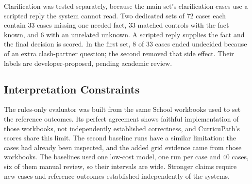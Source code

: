 Clarification was tested separately, because the main set's clarification
cases use a scripted reply the system cannot read. Two dedicated sets of 72
cases each contain 33 cases missing one needed fact, 33 matched controls with
the fact known, and 6 with an unrelated unknown. A scripted reply supplies the
fact and the final decision is scored. In the first set, 8 of 33 cases ended
undecided because of an extra clash-partner question; the second removed that
side effect. Their labels are developer-proposed, pending academic review.

\subsection{Interpretation Constraints}
The rules-only evaluator was built from the same School workbooks used to set
the reference outcomes. Its perfect agreement shows faithful implementation of
those workbooks, not independently established correctness, and CurricuPath's
scores share this limit. The second baseline runs have a similar limitation:
the cases had already been inspected, and the added grid evidence came from
those workbooks. The baselines used one low-cost model, one run per case and
40 cases, six of them manual review, so their intervals are wide. Stronger
claims require new cases and reference outcomes established independently of
the systems.
